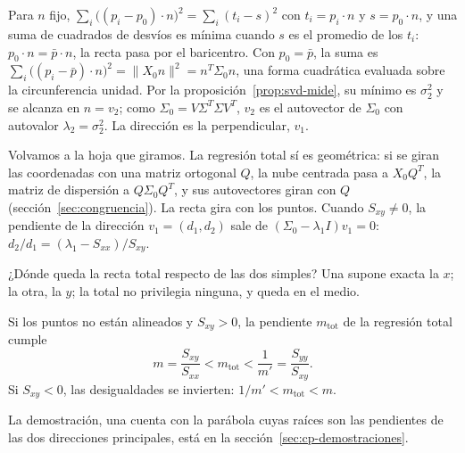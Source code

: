 \begin{demostracion}
Para \(n\) fijo, \(\sum_i\big((p_i-p_0)\cdot n\big)^2=\sum_i(t_i-s)^2\) con
\(t_i=p_i\cdot n\) y \(s=p_0\cdot n\), y una suma de cuadrados de desvíos es mínima cuando
\(s\) es el promedio de los \(t_i\): \(p_0\cdot n=\bar p\cdot n\), la recta pasa por el
baricentro. Con \(p_0=\bar p\), la suma es
\(\sum_i\big((p_i-\bar p)\cdot n\big)^2=\lVert X_0n\rVert^2=n^T\Sigma_0n\), una forma cuadrática
evaluada sobre la circunferencia unidad. Por la proposición~\ref{prop:svd-mide}, su mínimo
es \(\sigma_2^2\) y se alcanza en \(n=v_2\); como \(\Sigma_0=V\Sigma^T\Sigma V^T\), \(v_2\) es el
autovector de \(\Sigma_0\) con autovalor \(\lambda_2=\sigma_2^2\). La dirección es la perpendicular,
\(v_1\).
\end{demostracion}

Volvamos a la hoja que giramos. La
regresión total sí es geométrica: si se giran las coordenadas con una matriz ortogonal
\(Q\), la nube centrada pasa a \(X_0Q^T\), la matriz de dispersión a \(Q\Sigma_0Q^T\), y sus
autovectores giran con \(Q\) (sección~\ref{sec:congruencia}). La recta gira con los
puntos. Cuando \(S_{xy}\neq0\), la pendiente de la dirección \(v_1=(d_1,d_2)\) sale de
\((\Sigma_0-\lambda_1I)v_1=0\): \(d_2/d_1=(\lambda_1-S_{xx})/S_{xy}\).

¿Dónde queda la recta total respecto de las dos simples? Una supone exacta la \(x\); la otra,
la \(y\); la total no privilegia ninguna, y queda en el medio.

\begin{proposicion}\label{prop:cp-total-entre}
Si los puntos no están alineados y \(S_{xy}>0\), la pendiente \(m_{\mathrm{tot}}\) de la regresión total
cumple
\[
  m=\frac{S_{xy}}{S_{xx}}<m_{\mathrm{tot}}<\frac{1}{m'}=\frac{S_{yy}}{S_{xy}} .
\]
Si \(S_{xy}<0\), las desigualdades se invierten: \(1/m'<m_{\mathrm{tot}}<m\).
\end{proposicion}

La demostración, una cuenta con la parábola cuyas raíces son las pendientes de las dos
direcciones principales, está en la sección~\ref{sec:cp-demostraciones}.

